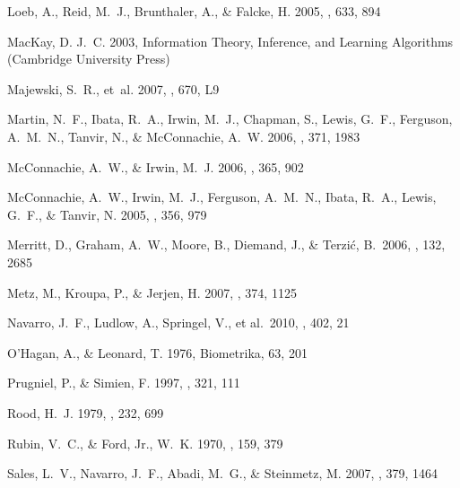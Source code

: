\documentclass[preprint,12pt]{aastex}
\begin{document}
\begin{thebibliography}{}
{Loeb}, A., {Reid}, M.~J., {Brunthaler}, A., \& {Falcke}, H. 2005, \apj, 633,
  894

{MacKay}, D. J.~C. 2003, Information Theory, Inference, and Learning Algorithms
  (Cambridge University Press)

{Majewski}, S.~R., {et~al.} 2007, \apjl, 670, L9

{Martin}, N.~F., {Ibata}, R.~A., {Irwin}, M.~J., {Chapman}, S., {Lewis}, G.~F.,
  {Ferguson}, A.~M.~N., {Tanvir}, N., \& {McConnachie}, A.~W. 2006, \mnras,
  371, 1983

{McConnachie}, A.~W., \& {Irwin}, M.~J. 2006, \mnras, 365, 902

{McConnachie}, A.~W., {Irwin}, M.~J., {Ferguson}, A.~M.~N., {Ibata}, R.~A.,
  {Lewis}, G.~F., \& {Tanvir}, N. 2005, \mnras, 356, 979

 Merritt, D., Graham,
A.~W., Moore, B., Diemand, J., \& Terzi{\'c}, B.\ 2006, \aj, 132, 2685

{Metz}, M., {Kroupa}, P., \& {Jerjen}, H. 2007, \mnras, 374, 1125

 Navarro, J.~F., Ludlow,
A., Springel, V., et al.\ 2010, \mnras, 402, 21

O'Hagan, A., \& Leonard, T. 1976, Biometrika, 63, 201

{Prugniel}, P., \& {Simien}, F. 1997, \aap, 321, 111

{Rood}, H.~J. 1979, \apj, 232, 699

{Rubin}, V.~C., \& {Ford}, Jr., W.~K. 1970, \apj, 159, 379

{Sales}, L.~V., {Navarro}, J.~F., {Abadi}, M.~G., \& {Steinmetz}, M. 2007,
  \mnras, 379, 1464


\end{thebibliography}
\end{document}
